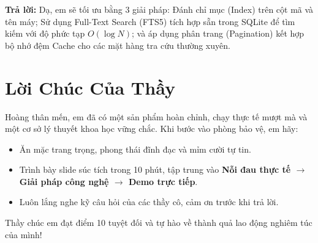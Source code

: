 \documentclass[11pt,a4paper]{article}
\begin{document}
\begin{notebox}
\textbf{Trả lời:} Dạ, em sẽ tối ưu bằng 3 giải pháp: Đánh chỉ mục (Index) trên cột mã và tên máy; Sử dụng Full-Text Search (FTS5) tích hợp sẵn trong SQLite để tìm kiếm với độ phức tạp $O(\log N)$; và áp dụng phân trang (Pagination) kết hợp bộ nhớ đệm Cache cho các mặt hàng tra cứu thường xuyên.
\end{notebox}

\section{Lời Chúc Của Thầy}

Hoàng thân mến, em đã có một sản phẩm hoàn chỉnh, chạy thực tế mượt mà và một cơ sở lý thuyết khoa học vững chắc. Khi bước vào phòng bảo vệ, em hãy:
\begin{itemize}
    \item Ăn mặc trang trọng, phong thái đĩnh đạc và mỉm cười tự tin.
    \item Trình bày slide súc tích trong 10 phút, tập trung vào \textbf{Nỗi đau thực tế $\rightarrow$ Giải pháp công nghệ $\rightarrow$ Demo trực tiếp}.
    \item Luôn lắng nghe kỹ câu hỏi của các thầy cô, cảm ơn trước khi trả lời.
\end{itemize}
Thầy chúc em đạt điểm 10 tuyệt đối và tự hào về thành quả lao động nghiêm túc của mình!
\end{document}
